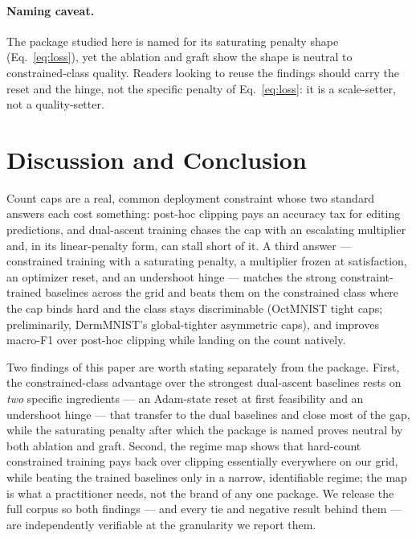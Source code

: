 \documentclass[10pt]{article}
\begin{document}
\paragraph{Naming caveat.}
The package studied here is named for its saturating penalty shape
(Eq.~\eqref{eq:loss}), yet the ablation and graft show the shape is
neutral to constrained-class quality. Readers looking to reuse the
findings should carry the reset and the hinge, not the specific penalty
of Eq.~\eqref{eq:loss}: it is a scale-setter, not a quality-setter.

\section{Discussion and Conclusion}
\label{sec:conclusion}

Count caps are a real, common deployment constraint whose two standard
answers each cost something: post-hoc clipping pays an accuracy tax for
editing predictions, and dual-ascent training chases the cap with an
escalating multiplier and, in its linear-penalty form, can stall short of
it. A third answer --- constrained training with a saturating penalty, a
multiplier frozen at satisfaction, an optimizer reset, and an undershoot
hinge --- matches the strong constraint-trained baselines across the grid
and beats them on the constrained class where the cap binds hard and the
class stays discriminable (OctMNIST tight caps; preliminarily,
DermMNIST's global-tighter asymmetric caps), and improves macro-F1 over
post-hoc clipping while landing on the count natively.

Two findings of this paper are worth stating separately from the
package. First, the constrained-class advantage over the strongest
dual-ascent baselines rests on \emph{two} specific ingredients --- an
Adam-state reset at first feasibility and an undershoot hinge --- that
transfer to the dual baselines and close most of the gap, while the
saturating penalty after which the package is named proves neutral by
both ablation and graft. Second, the regime map shows that hard-count
constrained training pays back over clipping essentially everywhere on
our grid, while beating the trained baselines only in a narrow,
identifiable regime; the map is what a practitioner needs, not the
brand of any one package. We release the full corpus so both findings
--- and every tie and negative result behind them --- are independently
verifiable at the granularity we report them.
\end{document}
